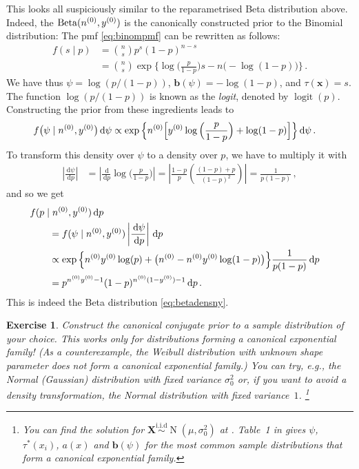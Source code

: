 \documentclass[12pt,a4paper	,twoside]{article}
\newcommand{\dd}{\,\mathrm{d}}
\newcommand{\mbf}[1]{\mathbf{#1}}
\newcommand{\bs}[1]{\boldsymbol{#1}}
\renewcommand{\vec}[1]{{\bs#1}}
\newcommand{\be}{\operatorname{Beta}}
\newcommand{\norm}{\operatorname{N}}
\newcommand{\logit}{\operatorname{logit}} %
\newtheorem{myex}{Exercise}
\begin{document}
This looks all suspiciously similar to the reparametrised Beta distribution above.
Indeed, the $\be(\nz,\yz)$ is the canonically constructed prior to the Binomial distribution:
The pmf \eqref{eq:binompmf} can be rewritten as follows:
\begin{align}
f(s\mid p)
 &= {n \choose s} p^s (1-p)^{n-s} \\
 &= {n \choose s} \exp\Big\{ \log\Big(\frac{p}{1-p}\Big) s - n \big(-\log(1-p)\big) \Big\} \,.
\end{align}
We have thus $\psi = \log(p/(1-p))$, $\mbf{b}(\psi) = -\log(1-p)$, and $\tau(\vec{x}) = s$.
The function $\log(p/(1-p))$ is known as the \emph{logit}, denoted by $\logit(p)$.
Constructing the prior from these ingredients leads to
\begin{align}
f\big(\psi \mid \nz, \yz\big) \dd\psi %
 &\propto \exp\Big\{ \nz \Big[ \yz \log\Big(\frac{p}{1-p}\Big) + \log(1-p) \Big] \Big\} \dd\psi\,.
\end{align}
To transform this density over $\psi$ to a density over $p$,
we have to multiply it with
\begin{align}
\left|\frac{\dd\psi}{\dd p}\right|
 &= \left|\frac{\dd}{\dd p} \log\Big(\frac{p}{1-p}\Big)\right|
  = \left| \frac{1-p}{p}\left(\frac{(1-p)+p}{(1-p)^2}\right) \right|
  = \frac{1}{p(1-p)}\,,
\end{align}
and so we get
\begin{align}
\lefteqn{f(p\mid \nz, \yz)\dd p} \qquad \\  
 &= f(\psi\mid \nz, \yz) \left|\frac{\dd\psi}{\dd p}\right| \dd p\\
 &\propto \exp\Big\{ \nz\yz\log(p) + \big(\nz - \nz\yz\log(1-p)\big)\Big\} \frac{1}{p(1-p)}\dd p\\
 &= p^{\nz\yz - 1} (1-p)^{\nz(1-\yz) - 1} \dd p\,.
\end{align}
This is indeed the Beta distribution \eqref{eq:betadensny}.%

\begin{myex}
Construct the canonical conjugate prior to a sample distribution of your choice.
This works only for distributions forming a canonical exponential family!
(As a counterexample, the Weibull distribution with unknown shape parameter does not form a canonical exponential family.)
You can try, e.g., the Normal (Gaussian) distribution with fixed variance $\sigma^2_0$
or, if you want to avoid a density transformation, the Normal distribution with fixed variance~$1$.%
\footnote{You can find the solution for $\vec{X} \stackrel{\text{i.i.d}}{\sim} \norm(\mu, \sigma^2_0)$
at \textcite[pp.~14f]{2013:diss-gw}.
Table~1 in \textcite{2005:quaeghebeurcooman} gives $\psi$, $\tau^*(x_i)$, $a(x)$ and $\mbf{b}(\psi)$
for the most common sample distributions that form a canonical exponential family.}
\end{myex}
\end{document}
